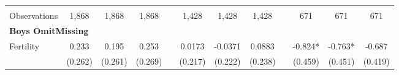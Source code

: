 \begin{landscape}
\begin{table}[htpb!]
\begin{center}
\begin{tabular}{lcccp{2mm}cccp{2mm}ccc}
\begin{footnotesize}\end{footnotesize}&\begin{footnotesize}\end{footnotesize}&\begin{footnotesize}\end{footnotesize}&\begin{footnotesize}\end{footnotesize}&\begin{footnotesize}\end{footnotesize}&\begin{footnotesize}\end{footnotesize}&\begin{footnotesize}\end{footnotesize}&\begin{footnotesize}\end{footnotesize}&\begin{footnotesize}\end{footnotesize}&\begin{footnotesize}\end{footnotesize}&\begin{footnotesize}\end{footnotesize}&\begin{footnotesize}\end{footnotesize}\\Observations&1,868&1,868&1,868&&1,428&1,428&1,428&&671&671&671\\
\multicolumn{12}{l}{\textbf{Boys OmitMissing}}\\ 
Fertility&0.233&0.195&0.253&&0.0173&-0.0371&0.0883&&-0.824*&-0.763*&-0.687\\
&(0.262)&(0.261)&(0.269)&&(0.217)&(0.222)&(0.238)&&(0.459)&(0.451)&(0.419)\\

\end{tabular}
\end{center}
\end{table}
\end{landscape}
